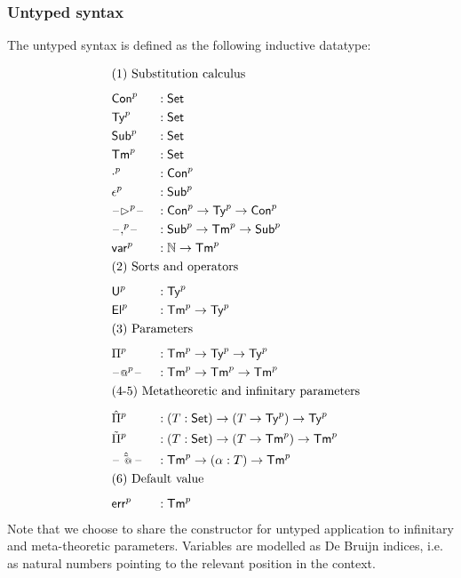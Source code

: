 \subsubsection{Untyped syntax}
The untyped syntax is defined as the following inductive datatype:

\begin{alignat*}{5}
  & \rlap{(1) Substitution calculus} \\[0.5em]
  & \Conu && : \Set \\
  & \Tyu  && : \Set \\
  & \Subu  && : \Set \\
  & \Tmu  && : \Set \\
  & \emptyu && : \Conu \\
    & \epsilonu && : \Subu \\
  & \blank\extu\blank && : \Conu\ra\Tyu\ra\Conu \\
  & \blank\consu\blank && : \Subu\ra\Tmu\ra\Subu \\
  & \varu  && : \N \ra \Tmu \\
  & \rlap{(2) Sorts and operators} \\[0.5em]
  & \Uu && : \Tyu \\
  & \Elu && : \Tmu\ra\Tyu \\
  & \rlap{(3) Parameters} \\[0.5em]
  & \Piu && : \Tmu\ra\Tyu\ra\Tyu \\
  & \blank\appu\blank && : \Tmu\ra\Tmu\ra \Tmu \\
  & \rlap{(4-5) Metatheoretic and infinitary parameters} \\[0.5em]
  & \Pimu && : (T:\Set)\ra(T\ra\Tyu)\ra\Tyu \\
  & \Piiu && : (T:\Set)\ra(T\ra\Tmu)\ra\Tmu \\
  & \blank\appmu \blank && : \Tmu\ra(\alpha:T) \ra\Tmu\\
  & \rlap{(6) Default value} \\[0.5em]
  & \erru && : \Tmu
\end{alignat*}
Note that we choose to share the constructor for untyped application to infinitary and
meta-theoretic parameters.
Variables are modelled as De Bruijn indices, i.e. as natural numbers pointing
to the relevant position in the context.



